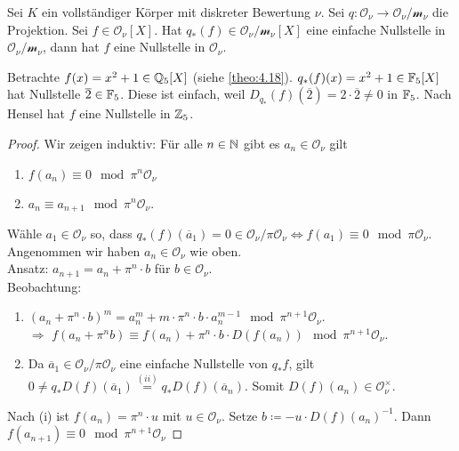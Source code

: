 \documentclass[../main.tex]{subfiles}
\begin{document}
\begin{lemma}
    Sei $K$ ein vollständiger Körper mit diskreter Bewertung $\nu$. Sei $q: \mathcal{O}_\nu\rightarrow \mathcal{O}_\nu/\mathcal{m}_\nu$ die Projektion.
    Sei $f\in \mathcal{O}_\nu[X]$. Hat $q_*(f)\in \mathcal{O}_\nu/\mathcal{m}_\nu [X]$ eine einfache Nullstelle in $\mathcal{O}_\nu/\mathcal{m}_\nu$, dann hat $f$ eine Nullstelle in $\mathcal{O}_\nu$.
\end{lemma}
\begin{example*}
    Betrachte $f(x)= x^2+1\in\mathbb{Q}_5[X]$ (siehe \ref{theo:4.18}).
    $q_*(f)(x) = x^2+1\in \mathbb{F}_5[X]$ hat Nullstelle $\overline{2}\in \mathbb{F}_5$. Diese ist einfach, weil $D_{q_*}(f)(\overline{2}) = 2\cdot \overline{2}\neq 0$ in $\mathbb{F}_5$.
    Nach Hensel hat $f$ eine Nullstelle in $\mathbb{Z}_5$.
\end{example*}
\begin{proof}
    Wir zeigen induktiv:
    Für alle $n\in \mathbb{N}$ gibt es $a_n\in \mathcal{O}_\nu$ gilt
    \begin{enumerate}[label=(\roman*),noitemsep]
        \item $f(a_n) \equiv 0 \mod \pi^n\mathcal{O}_\nu$
        \item $a_n\equiv a_{n+1} \mod \pi^n\mathcal{O}_\nu$.
    \end{enumerate}
    Wähle $a_1\in \mathcal{O}_\nu$ so, dass $q_*(f)(\overline{a}_1) = 0\in \mathcal{O}_\nu/\pi \mathcal{O}_\nu \Leftrightarrow f(a_1) \equiv 0\mod \pi \mathcal{O}_\nu$.
    Angenommen wir haben $a_n\in \mathcal{O}_\nu$ wie oben.\\
    Ansatz: $a_{n+1} = a_n + \pi^n \cdot b$ für $b\in \mathcal{O}_\nu$.\\
    Beobachtung:
    \begin{enumerate}[noitemsep]
        \item $(a_n+\pi^n\cdot b)^m = a_n^m + m\cdot \pi^n\cdot b\cdot a_n^{m-1} \mod \pi^{n+1}\mathcal{O}_\nu$.\\
        $\Longrightarrow$ $f(a_n+\pi^nb) \equiv f(a_n) + \pi^n\cdot b\cdot D(f(a_n)) \mod \pi^{n+1} \mathcal{O}_\nu$.
        \item Da $\overline{a}_1 \in \mathcal{O}_\nu/ \pi \mathcal{O}_\nu$ eine einfache Nullstelle von $q_* f$, gilt $0\neq q_* D(f)(\overline{a}_1) \overset{(ii)}{=} q_* D(f)(\overline{a}_n)$. Somit $D(f)(a_n)\in \mathcal{O}_\nu^\times$.
    \end{enumerate}
    
    Nach (i) ist $f(a_n) = \pi^n\cdot u$ mit $u\in \mathcal{O}_\nu$. Setze $b\coloneqq -u\cdot D(f)(a_n)^{-1}$.
    Dann $f(a_{n+1}) \equiv 0 \mod \pi^{n+1}\mathcal{O}_\nu$ 
\end{proof}
\end{document}
